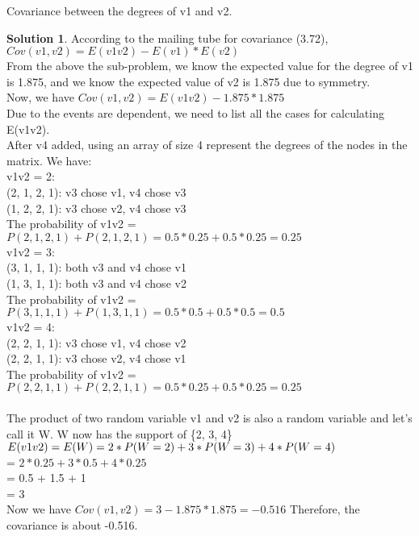 \documentclass[paper=a4, fontsize=11pt]{scrartcl} %
\numberwithin{equation}{section} %
\numberwithin{figure}{section} %
\numberwithin{table}{section} %
\theoremstyle{definition}
\newtheorem*{solution}{Solution}
\begin{document}
    Covariance between the degrees of v1 and v2.
    \begin{solution} 
    According to the mailing tube for covariance (3.72),\\ $Cov(v1,v2) = E(v1v2) - E(v1) * E(v2)$\\
    From the above the sub-problem, we know the expected value for the degree of v1 is 1.875, and we know the expected value of v2 is 1.875 due to symmetry.\\
    Now, we have $Cov(v1,v2) = E(v1v2) - 1.875 * 1.875$\\
    Due to the events are dependent, we need to list all the cases for calculating E(v1v2).\\
    After v4 added, using an array of size 4 represent the degrees of the nodes in the matrix. We have:\\
    v1v2 = 2:\\
    (2, 1, 2, 1): v3 chose v1, v4 chose v3\\
    (1, 2, 2, 1): v3 chose v2, v4 chose v3\\
    The probability of v1v2 = $P(2, 1, 2, 1) + P(2, 1, 2, 1) = 0.5*0.25 + 0.5*0.25 = 0.25$\\
    v1v2 = 3:\\
    (3, 1, 1, 1): both v3 and v4 chose v1\\
    (1, 3, 1, 1): both v3 and v4 chose v2\\
    The probability of v1v2 = $P(3, 1, 1, 1) + P(1, 3, 1, 1) = 0.5*0.5 + 0.5*0.5 = 0.5$\\
    v1v2 = 4:\\
    (2, 2, 1, 1): v3 chose v1, v4 chose v2\\
    (2, 2, 1, 1): v3 chose v2, v4 chose v1\\
    The probability of v1v2 = $P(2, 2, 1, 1) + P(2, 2, 1, 1) = 0.5*0.25 + 0.5*0.25 = 0.25$\\\\
    The product of two random variable v1 and v2 is also a random variable and let's call it W.
    W now has the support of \{2, 3, 4\}\\
    $E(v1v2)\\
    = E(W) = 2*P(W=2) + 3*P(W=3) + 4*P(W=4)$\\
    = $2*0.25 + 3*0.5 + 4*0.25$\\
    = 0.5 + 1.5 + 1\\
    = 3\\
    Now we have $Cov(v1,v2) = 3 - 1.875*1.875 = -0.516$
    Therefore, the covariance is about -0.516.
    \end{solution}
\end{document}

